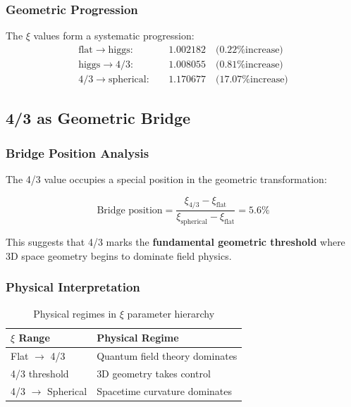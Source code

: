 	\subsubsection{Geometric Progression}
	\label{subsubsec:geometric_progression}
	
	The $\xi$ values form a systematic progression:
	\begin{align}
		\text{flat} \to \text{higgs}: \quad &1.002182 \quad \text{(0.22\% increase)} \\
		\text{higgs} \to \text{4/3}: \quad &1.008055 \quad \text{(0.81\% increase)} \\
		\text{4/3} \to \text{spherical}: \quad &1.170677 \quad \text{(17.07\% increase)}
	\end{align}
	
	\subsection{4/3 as Geometric Bridge}
	\label{subsec:four_thirds_bridge}
	
	\subsubsection{Bridge Position Analysis}
	\label{subsubsec:bridge_position}
	
	The 4/3 value occupies a special position in the geometric transformation:
	
	\begin{equation}
		\text{Bridge position} = \frac{\xi_{4/3} - \xi_{\text{flat}}}{\xi_{\text{spherical}} - \xi_{\text{flat}}} = 5.6\%
		\label{eq:bridge_position}
	\end{equation}
	
	This suggests that 4/3 marks the \textbf{fundamental geometric threshold} where 3D space geometry begins to dominate field physics.
	
	\subsubsection{Physical Interpretation}
	\label{subsubsec:physical_interpretation}
	
	\begin{table}[htbp]
		\centering
		\begin{tabular}{ll}
			\toprule
			\textbf{$\xi$ Range} & \textbf{Physical Regime} \\
			\midrule
			Flat $\to$ 4/3 & Quantum field theory dominates \\
			4/3 threshold & 3D geometry takes control \\
			4/3 $\to$ Spherical & Spacetime curvature dominates \\
			\bottomrule
		\end{tabular}
		\caption{Physical regimes in $\xi$ parameter hierarchy}
		\label{tab:physical_regimes}
	\end{table}
	
